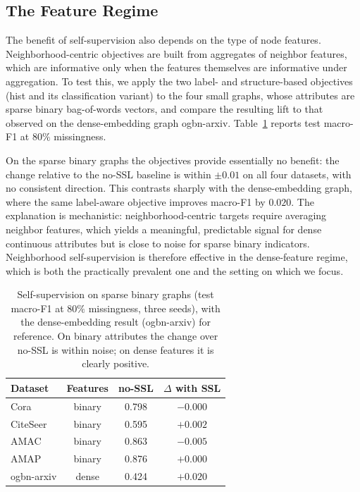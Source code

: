 \subsection{The Feature Regime}
\label{sec:exp-regime}

The benefit of self-supervision also depends on the type of node features. Neighborhood-centric objectives are built from aggregates of neighbor features, which are informative only when the features themselves are informative under aggregation. To test this, we apply the two label- and structure-based objectives (hist and its classification variant) to the four small graphs, whose attributes are sparse binary bag-of-words vectors, and compare the resulting lift to that observed on the dense-embedding graph ogbn-arxiv. Table~\ref{tab:regime} reports test macro-F1 at $80\%$ missingness.

On the sparse binary graphs the objectives provide essentially no benefit: the change relative to the no-SSL baseline is within $\pm 0.01$ on all four datasets, with no consistent direction. This contrasts sharply with the dense-embedding graph, where the same label-aware objective improves macro-F1 by $0.020$. The explanation is mechanistic: neighborhood-centric targets require averaging neighbor features, which yields a meaningful, predictable signal for dense continuous attributes but is close to noise for sparse binary indicators. Neighborhood self-supervision is therefore effective in the dense-feature regime, which is both the practically prevalent one and the setting on which we focus.

\begin{table}[t]
\centering
\caption{Self-supervision on sparse binary graphs (test macro-F1 at $80\%$ missingness, three seeds), with the dense-embedding result (ogbn-arxiv) for reference. On binary attributes the change over no-SSL is within noise; on dense features it is clearly positive.}
\label{tab:regime}
\small
\begin{tabular}{@{}lccc@{}}
\toprule
\textbf{Dataset} & \textbf{Features} & \textbf{no-SSL} & \textbf{$\Delta$ with SSL} \\
\midrule
Cora        & binary  & 0.798 & $-0.000$ \\
CiteSeer    & binary  & 0.595 & $+0.002$ \\
AMAC        & binary  & 0.863 & $-0.005$ \\
AMAP        & binary  & 0.876 & $+0.000$ \\
\midrule
ogbn-arxiv  & dense   & 0.424 & $+0.020$ \\
\bottomrule
\end{tabular}
\end{table}
